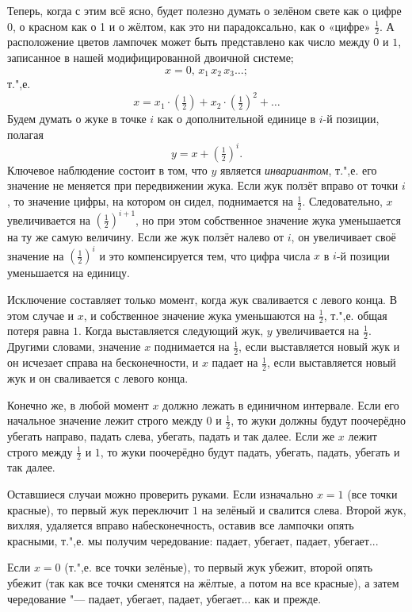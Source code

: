 \documentclass[twoside]{book}
\begin{document}
Теперь, когда с этим всё ясно, будет полезно думать о зелёном свете как о цифре 0, о красном как о 1 и о жёлтом, как это ни парадоксально, как о «цифре» $\tfrac12$.
А расположение цветов лампочек может быть представлено как число между $0$ и $1$, записанное в нашей модифицированной двоичной системе;
\[x = 0{,}\,x_1\,x_2\,x_3\dots;\]
т.",е.
 \[x = x_1\cdot(\tfrac12)+x_2\cdot(\tfrac12)^2+\dots\]
Будем думать о жуке в точке $i$ как о дополнительной единице в $i$-й позиции, 
полагая
\[y=x+(\tfrac12)^i.\]
Ключевое наблюдение состоит в том, что $y$ является \emph{инвариантом}, т.",е. его значение не меняется при передвижении жука.
Если жук ползёт вправо от точки $i$, то значение цифры, на котором он сидел, поднимается на $\tfrac12$.
Следовательно, $x$ увеличивается на $(\tfrac12)^{i+1}$, но при этом собственное значение жука уменьшается на ту же самую величину.
Если же жук ползёт налево от $i$, он увеличивает своё значение на $(\tfrac12)^i$ и это компенсируется тем, что цифра числа $x$ в $i$-й позиции уменьшается на единицу.

Исключение составляет только момент, когда жук сваливается с левого конца.
В этом случае и $x$, и собственное значение жука уменьшаются на $\tfrac12$, т.",е. общая потеря равна $1$.
Когда выставляется следующий жук, $y$ увеличивается на $\tfrac12$.
Другими словами, значение $x$ поднимается на $\tfrac12$, если выставляется новый жук и он исчезает справа на бесконечности, и $x$ падает на $\tfrac12$, если выставляется новый жук и он сваливается с левого конца.

Конечно же, в любой момент $x$ должно лежать в единичном интервале.
Если его начальное значение лежит строго между $0$ и $\tfrac12$, то жуки должны будут поочерёдно убегать направо, падать слева, убегать, падать и так далее.
Если же $x$ лежит строго между $\tfrac12$ и $1$, то жуки поочерёдно будут падать, убегать, падать, убегать и так далее.

Оставшиеся случаи можно проверить руками.
Если изначально $x = 1$ (все точки красные), то первый жук переключит $1$ на зелёный и свалится слева.
Второй жук, вихляя, удаляется вправо на\pagebreak[3] бесконечность, оставив все лампочки опять красными, т.",е. мы получим чередование: падает, убегает, падает, убегает...

Если $x = 0$ (т.",е. все точки зелёные), то первый жук убежит, второй опять убежит (так как все точки сменятся на жёлтые, а потом на все красные), а затем чередование "--- падает, убегает, падает, убегает... как и прежде.
\end{document}
